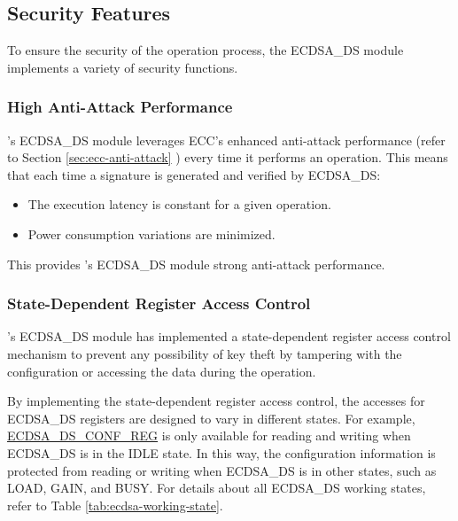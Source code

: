 \documentclass[main\_\_EN.tex]{subfiles}
\begin{document}

\subsection{Security Features}
\label{sec:ecdsa-security_features}

To ensure the security of the operation process, the ECDSA\_DS module implements a variety of security functions.

\subsubsection{High Anti-Attack Performance}

\chipseries{}'s ECDSA\_DS module leverages ECC's enhanced anti-attack performance (refer to Section \ref{sec:ecc-anti-attack} \textit{}) every time it performs an operation. This means that each time a signature is generated and verified by ECDSA\_DS:

\begin{itemize}
    \item The execution latency is constant for a given operation.
    \item Power consumption variations are minimized.
\end{itemize}

This provides \chipseries{}'s ECDSA\_DS module strong anti-attack performance.

\subsubsection{State-Dependent Register Access Control}

\chipseries{}'s ECDSA\_DS module has implemented a state-dependent register access control mechanism to prevent any possibility of key theft by tampering with the configuration or accessing the data during the operation.

By implementing the state-dependent register access control, the accesses for ECDSA\_DS registers are designed to vary in different states. For example, \hyperref[regdesc:ECDSADSCONFREG]{ECDSA\_DS\_CONF\_REG} is only available for reading and writing when ECDSA\_DS is in the IDLE state. In this way, the configuration information is protected from reading or writing when ECDSA\_DS is in other states, such as LOAD, GAIN, and BUSY. For details about all ECDSA\_DS working states, refer to Table \ref{tab:ecdsa-working-state}.
\end{document}
